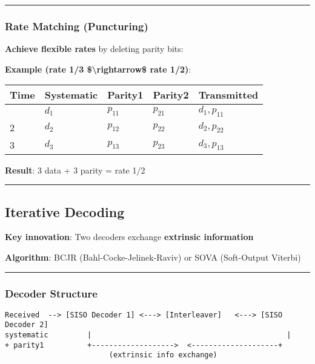 \begin{center}\rule{0.5\linewidth}{0.5pt}\end{center}

\subsubsection{Rate Matching
(Puncturing)}\label{rate-matching-puncturing}

\textbf{Achieve flexible rates} by deleting parity bits:

\textbf{Example (rate 1/3 \$\textbackslash rightarrow\$ rate 1/2)}:

{\def\LTcaptype{} %
\begin{longtable}[]{@{}lllll@{}}
\toprule\noalign{}
Time & Systematic & Parity1 & Parity2 & Transmitted \\
\midrule\noalign{}
\endhead
\bottomrule\noalign{}
\endlastfoot
1 & \(d_1\) & \(p_{11}\) & \(p_{21}\) & \(d_1, p_{11}\) \\
2 & \(d_2\) & \(p_{12}\) & \(p_{22}\) & \(d_2, p_{22}\) \\
3 & \(d_3\) & \(p_{13}\) & \(p_{23}\) & \(d_3, p_{13}\) \\
\end{longtable}
}

\textbf{Result}: 3 data + 3 parity = rate 1/2

\begin{center}\rule{0.5\linewidth}{0.5pt}\end{center}

\subsection{Iterative Decoding}\label{iterative-decoding}

\textbf{Key innovation}: Two decoders exchange \textbf{extrinsic
information}

\textbf{Algorithm}: BCJR (Bahl-Cocke-Jelinek-Raviv) or SOVA (Soft-Output
Viterbi)

\begin{center}\rule{0.5\linewidth}{0.5pt}\end{center}

\subsubsection{Decoder Structure}\label{decoder-structure}

\begin{verbatim}
Received  --> [SISO Decoder 1] <---> [Interleaver]   <---> [SISO Decoder 2]
systematic         |                                             |
+ parity1          +------------------->  <--------------------+
                        (extrinsic info exchange)
\end{verbatim}

